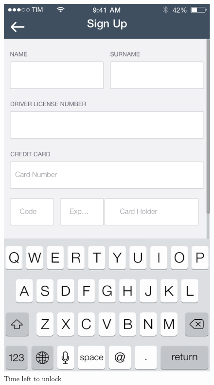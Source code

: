 \documentclass[12pt]{article}
\begin{document}
\begin{figure}
 	 	  \includegraphics[scale=0.25]{Images/mobileApp/Register.png}
		  \caption{Time left to unlock}
		  \endminipage
 	 	\end{figure}
 	 	\clearpage
 	 	
\end{document}
